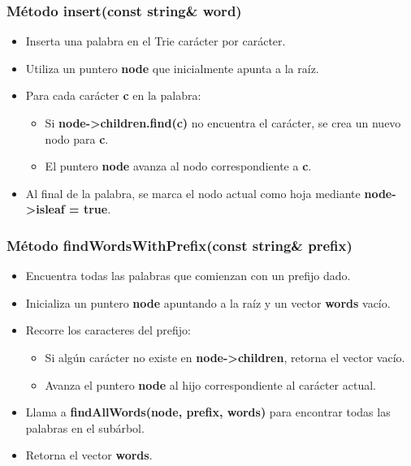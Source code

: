 \documentclass[corference]{IEEEtran}
\begin{document}
\begin{flushleft}
            \subsubsection{Método insert(const string\& word)}
                \begin{itemize}
                    \item Inserta una palabra en el Trie carácter por carácter.
                    \item Utiliza un puntero \textbf{node} que inicialmente apunta a la raíz.
                    \item Para cada carácter \textbf{c} en la palabra:
                    \begin{itemize}
                        \item Si \textbf{node->children.find(c)} no encuentra el carácter, se crea un nuevo nodo para \textbf{c}.
                        \item El puntero \textbf{node} avanza al nodo correspondiente a \textbf{c}.
                    \end{itemize}
                    \item Al final de la palabra, se marca el nodo actual como hoja mediante \textbf{node->isleaf = true}.
                \end{itemize}
                
            \subsubsection{Método findWordsWithPrefix(const string\& prefix)}
                \begin{itemize}
                    \item Encuentra todas las palabras que comienzan con un prefijo dado.
                    \item Inicializa un puntero \textbf{node} apuntando a la raíz y un vector \textbf{words} vacío.
                    \item Recorre los caracteres del prefijo:
                    \begin{itemize}
                        \item Si algún carácter no existe en \textbf{node->children}, retorna el vector vacío.
                        \item Avanza el puntero \textbf{node} al hijo correspondiente al carácter actual.
                    \end{itemize}
                    \item Llama a \textbf{findAllWords(node, prefix, words)} para encontrar todas las palabras en el subárbol.
                    \item Retorna el vector \textbf{words}.
                \end{itemize}
                

\end{flushleft}
\end{document}
